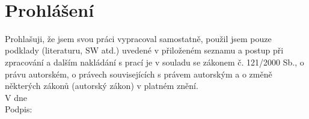 \newpage

~\\[7cm]
\section*{Prohlášení}

Prohlašuji, že jsem svou práci vypracoval samostatně, použil jsem pouze
podklady (literaturu, SW atd.) uvedené v přiloženém seznamu a postup při
zpracování a dalším nakládání s prací je v souladu se zákonem č. 121/2000 Sb.,
o právu autorském, o právech souvisejících s právem autorským a o změně
některých zákonů (autorský zákon) v platném znění.\\[1.5cm]

V \makebox[6cm]{\dotfill} dne \makebox[6cm]{\dotfill}\\[4cm]

Podpis: \makebox[12cm]{\dotfill}

\newpage

\tableofcontents
